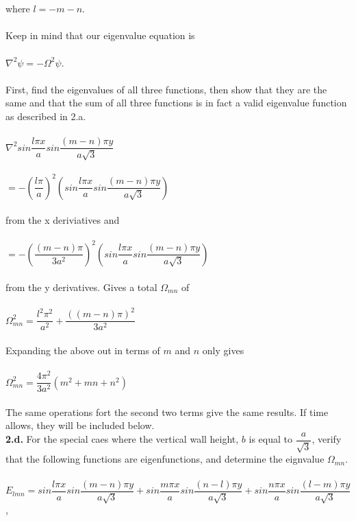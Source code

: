 \documentclass[prb,preprint]
{revtex4-1}
\newcommand{\PRLsep}{\noindent\makebox[\linewidth]{\resizebox{0.8888\linewidth}{2pt}{$\bullet$}}\bigskip}
\begin{document}
\\
\\
where $l = -m-n$.  
\\
\\
Keep in mind that our eigenvalue equation is 
\\
\\
$\nabla^2\psi = -\Omega^2 \psi$.
\\
\\
First, find the eigenvalues of all three functions, then show that they are the same and that the sum of all three functions is in fact a valid eigenvalue function as described in 2.a.
\\
\\
$\nabla^2 sin\dfrac{l\pi x}{a} sin\dfrac{\left(m-n\right) \pi y}{a \sqrt{3}}$
\\
\\
$= -\left(\dfrac{l\pi}{a}\right)^2\left(sin\dfrac{l\pi x}{a} sin\dfrac{\left(m-n\right) \pi y}{a \sqrt{3}}\right)$
\\
\\
from the x deriviatives and 
\\
\\
$= -\left(\dfrac{\left(m-n\right)\pi}{3a^2}\right)^2\left(sin\dfrac{l\pi x}{a} sin\dfrac{\left(m-n\right) \pi y}{a \sqrt{3}}\right)$
\\
\\
from the y derivatives.  Gives a total $\Omega_{mn}$ of 
\\
\\
$\Omega_{mn}^2 = \dfrac{l^2 \pi^2}{a^2} + \dfrac{\left(\left(m-n\right)\pi\right)^2}{3a^2}$
\\
\\
Expanding the above out in terms of $m$ and $n$ only gives
\\
\\
$\Omega_{mn}^2 = \dfrac{4 \pi^2}{3a^2}\left(m^2 + mn + n^2\right)$
\\
\\
The same operations fort the second two terms give the same results.  If time allows, they will be included below.
\PRLsep
\\
\newpage
\textbf{2.d.}
For the special caes where the vertical wall height, $b$ is equal to $\dfrac{a}{\sqrt{3}}$, verify that the following functions are eigenfunctions, and determine the eignvalue $\Omega_{mn}$.
\\
\\
$E_{lmn} = sin\dfrac{l\pi x}{a} sin\dfrac{\left(m-n\right)\pi y}{a\sqrt{3}} + sin\dfrac{m\pi x}{a} sin\dfrac{\left(n-l\right)\pi y}{a\sqrt{3}} + sin\dfrac{n\pi x}{a} sin\dfrac{\left(l-m\right)\pi y}{a\sqrt{3}}$,
\end{document}
